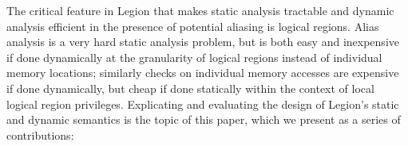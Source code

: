 The critical feature in Legion that makes static analysis tractable
and dynamic analysis efficient in the presence of potential aliasing is logical regions.
Alias analysis is a very hard static analysis problem, but is both easy and
inexpensive if done dynamically at the granularity of logical regions instead
of individual memory locations; similarly
checks on individual memory accesses are expensive if done dynamically, but
cheap if done statically within the context of local logical region privileges.
Explicating and evaluating the design of Legion's
static and dynamic semantics is the topic of this paper, 
which we present as a series of contributions:
